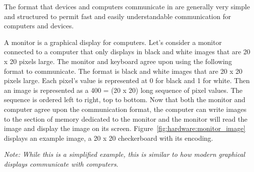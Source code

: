 The format that devices and computers communicate in are generally very simple
and structured to permit fast and easily understandable communication for
computers and devices.

\begin{example}
A monitor is a graphical display for computers. Let's consider a monitor
connected to a computer that only displays in black and white images
that are 20 x 20 pixels large. The monitor and keyboard agree upon using
the following format to communicate. The format is black and white images
that are 20 x 20 pixels large. Each pixel's value is represented at 0 for
black and 1 for white. Then an image is represented as a 400 = (20 x 20) long
sequence of pixel values. The sequence is ordered left to right, top to bottom.
Now that both the monitor and computer agree upon the communication format, the
computer can write images to the section of memory dedicated to the monitor
and the monitor will read the image and display the image on its screen.
Figure~\ref{fig:hardware:monitor_image} displays an example image, a 
20 x 20 checkerboard with its encoding.

\emph{Note: While this is a simplified example, this is similar to how modern
  graphical displays communicate with computers}.
\end{example}

